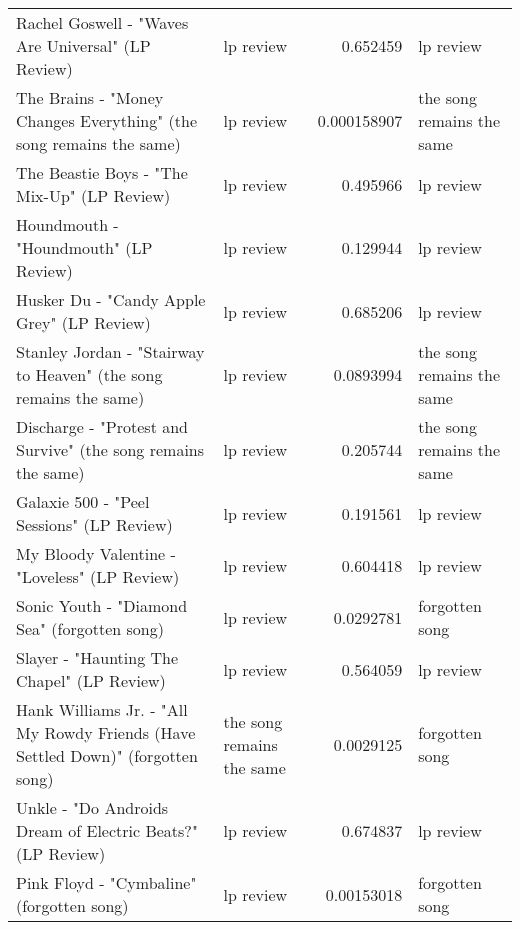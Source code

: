 \documentclass[letterpaper,10pt]{article}
\begin{document}
\begin{table}[H]
\begin{adjustbox}{max width=\linewidth}
\begin{tabular}{llrl}
 Rachel Goswell - "Waves Are Universal" (LP Review)                               & lp review                 &  0.652459    & lp review                 \\
 The Brains - "Money Changes Everything" (the song remains the same)              & lp review                 &  0.000158907 & the song remains the same \\
 The Beastie Boys - "The Mix-Up" (LP Review)                                      & lp review                 &  0.495966    & lp review                 \\
 Houndmouth - "Houndmouth" (LP Review)                                            & lp review                 &  0.129944    & lp review                 \\
 Husker Du - "Candy Apple Grey" (LP Review)                                       & lp review                 &  0.685206    & lp review                 \\
 Stanley Jordan - "Stairway to Heaven" (the song remains the same)                & lp review                 &  0.0893994   & the song remains the same \\
 Discharge - "Protest and Survive" (the song remains the same)                    & lp review                 &  0.205744    & the song remains the same \\
 Galaxie 500 - "Peel Sessions" (LP Review)                                        & lp review                 &  0.191561    & lp review                 \\
 My Bloody Valentine - "Loveless" (LP Review)                                     & lp review                 &  0.604418    & lp review                 \\
 Sonic Youth - "Diamond Sea" (forgotten song)                                     & lp review                 &  0.0292781   & forgotten song            \\
 Slayer - "Haunting The Chapel" (LP Review)                                       & lp review                 &  0.564059    & lp review                 \\
 Hank Williams Jr. - "All My Rowdy Friends (Have Settled Down)" (forgotten song)  & the song remains the same &  0.0029125   & forgotten song            \\
 Unkle - "Do Androids Dream of Electric Beats?" (LP Review)                       & lp review                 &  0.674837    & lp review                 \\
 Pink Floyd - "Cymbaline" (forgotten song)                                        & lp review                 &  0.00153018  & forgotten song            \\

\end{tabular}
\end{adjustbox}
\end{table}
\end{document}

